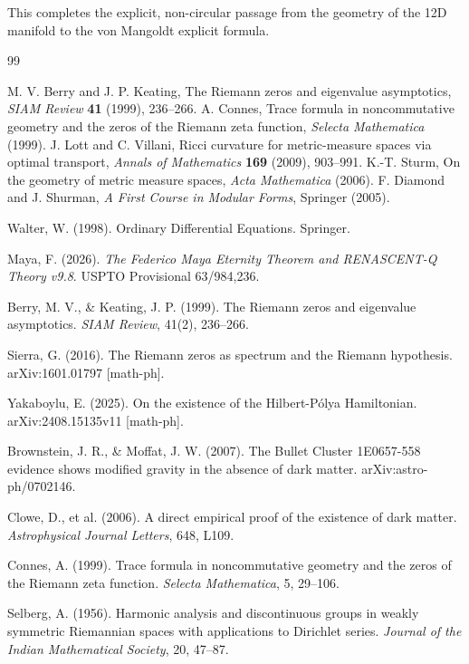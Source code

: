 \documentclass[11pt,a4paper]{article}
\begin{document}
This completes the explicit, non-circular passage from the geometry of the 12D manifold to the von Mangoldt explicit formula.

\begin{thebibliography}{99}

 M. V. Berry and J. P. Keating, The Riemann zeros and eigenvalue asymptotics, \textit{SIAM Review} \textbf{41} (1999), 236--266.
 A. Connes, Trace formula in noncommutative geometry and the zeros of the Riemann zeta function, \textit{Selecta Mathematica} (1999).
 J. Lott and C. Villani, Ricci curvature for metric-measure spaces via optimal transport, \textit{Annals of Mathematics} \textbf{169} (2009), 903--991.
 K.-T. Sturm, On the geometry of metric measure spaces, \textit{Acta Mathematica} (2006).
 F. Diamond and J. Shurman, \textit{A First Course in Modular Forms}, Springer (2005).

 Walter, W. (1998). Ordinary Differential Equations. Springer.

 Maya, F. (2026). \textit{The Federico Maya Eternity Theorem and RENASCENT-Q Theory v9.8}. USPTO Provisional 63/984,236.

 Berry, M. V., \& Keating, J. P. (1999). The Riemann zeros and eigenvalue asymptotics. \textit{SIAM Review}, 41(2), 236--266.

 Sierra, G. (2016). The Riemann zeros as spectrum and the Riemann hypothesis. arXiv:1601.01797 [math-ph].

 Yakaboylu, E. (2025). On the existence of the Hilbert-Pólya Hamiltonian. arXiv:2408.15135v11 [math-ph].

 Brownstein, J. R., \& Moffat, J. W. (2007). The Bullet Cluster 1E0657-558 evidence shows modified gravity in the absence of dark matter. arXiv:astro-ph/0702146.

 Clowe, D., et al. (2006). A direct empirical proof of the existence of dark matter. \textit{Astrophysical Journal Letters}, 648, L109.

 Connes, A. (1999). Trace formula in noncommutative geometry and the zeros of the Riemann zeta function. \textit{Selecta Mathematica}, 5, 29--106.

 Selberg, A. (1956). Harmonic analysis and discontinuous groups in weakly symmetric Riemannian spaces with applications to Dirichlet series. \textit{Journal of the Indian Mathematical Society}, 20, 47--87.


\end{thebibliography}
\end{document}
